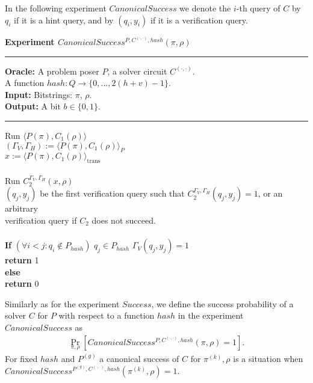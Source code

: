 In the following experiment $CanonicalSuccess$ we denote the $i$-th query of $C$ by $q_i$ if it is a hint query, and by $(q_i, y_i)$
if it is a verification query.
%
\begin{codeblock}
  \textbf{Experiment $CanonicalSuccess^{P, C^{(\cdot, \cdot)}, hash}(\pi, \rho)$}
  \medskip

  \hrule

  \medskip
  \textbf{Oracle:} A problem poser $P$, a solver circuit $C^{(\cdot, \cdot)}$.\\
  \IndII A function $hash: Q \rightarrow \{0, \dots, 2(h+v) - 1\}$.\\
  \textbf{Input:}  Bitstrings: $\pi$, $\rho$. \\
  \textbf{Output:} A bit $b \in \{0,1\}$.

  \medskip\hrule\medskip
  Run $\langle P(\pi), C_1(\rho) \rangle$ \\
  \IndI $(\Gamma_V, \Gamma_H) := \langle P(\pi), C_1(\rho) \rangle_{P}$ \\
  \IndI $x := \langle P(\pi), C_1(\rho) \rangle_{\text{trans}}$ \\ \\
  Run $C_2^{\Gamma_V, \Gamma_H} (x, \rho)$ \\
  \IndI $(q_j,y_j)$ be the first verification query such that $C_2^{\Gamma_V, \Gamma_H}(q_j, y_j) = 1$, or an arbitrary\\
  \IndI verification query if $C_2$ does not succeed.\\
  \\
  \textbf{If} $(\forall i < j :  q_i \notin P_{hash} )$ \And $q_j \in P_{hash}$ \And $\Gamma_V(q_j, y_j) = 1$ \then \\
  \IndI \textbf{return} 1\\
  \textbf{else}\\
  \IndI \textbf{return} 0
\end{codeblock}
%
Similarly as for the experiment $Success$, we define the success probability of a solver $C$ for $P$ with respect to a function $hash$
in the experiment $CanonicalSuccess$ as
%
\begin{align}
 \underset{\pi, \rho}{\Pr}[CanonicalSuccess^{P,C^{(\cdot, \cdot)},hash}(\pi, \rho) = 1].
\end{align}
%
For fixed $hash$ and $P^{(g)}$ a canonical success of $C$ for $\pi^{(k )}, \rho$ is a situation when \\ $CanonicalSuccess^{P^{(g)}, C^{(\cdot, \cdot)}, hash}(\pi^{(k)}, \rho) = 1$.


